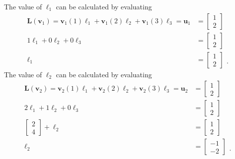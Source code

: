 \documentclass[12pt]{amsart}
\newcommand{\1}{\mathbbm{1}}
\numberwithin{equation}{section}
\numberwithin{Theorem}{section}
\theoremstyle{plain} %
\theoremstyle{definition}
\theoremstyle{remark}
\begin{document}
\begin{enumerate}[1.]
The value of $\boldsymbol{\ell}_{1}$ can be calculated by evaluating
\begin{align*}
	\mathbf{L}(\mathbf{v}_1) 
	= 
	\mathbf{v}_1(1)\boldsymbol{\ell}_{1} +
	\mathbf{v}_1(2)\boldsymbol{\ell}_{2} +
	\mathbf{v}_1(3)\boldsymbol{\ell}_{3} =
	\mathbf{u}_1 &= \begin{bmatrix} 1 \\ 2 \end{bmatrix} \\
%		
	1\boldsymbol{\ell}_{1} +
	0\boldsymbol{\ell}_{2} +
	0\boldsymbol{\ell}_{3} &=
	\begin{bmatrix}1 \\ 2 \end{bmatrix} \\
%		
	\boldsymbol{\ell}_{1} &=
	\begin{bmatrix}1 \\ 2 \end{bmatrix} 
	\begin{matrix} \\ \\ . \end{matrix}
\end{align*}
The value of $\boldsymbol{\ell}_{2}$ can be calculated by evaluating  
\begin{align*}
	\mathbf{L}(\mathbf{v}_2) 
	= 
	\mathbf{v}_2(1)\boldsymbol{\ell}_{1} +
	\mathbf{v}_2(2)\boldsymbol{\ell}_{2} +
	\mathbf{v}_2(3)\boldsymbol{\ell}_{3} =
	\mathbf{u}_2 &= \begin{bmatrix} 1 \\ 2 \end{bmatrix} \\
	2\boldsymbol{\ell}_{1} +
	1\boldsymbol{\ell}_{2} +
	0\boldsymbol{\ell}_{3} &=
	\begin{bmatrix}1 \\ 2 \end{bmatrix} \\
	\begin{bmatrix} 2 \\ 4 \end{bmatrix} +
	\boldsymbol{\ell}_{2} &=
	\begin{bmatrix}1 \\ 2 \end{bmatrix} \\
	\boldsymbol{\ell}_{2} &=
	\begin{bmatrix} -1 \\ -2 \end{bmatrix}
	\begin{matrix} \\ \\ . \end{matrix}

\end{align*}
\end{enumerate}
\end{document}
